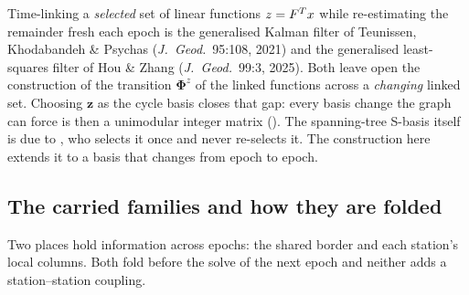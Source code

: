 \documentclass[main.tex]{subfiles}
\begin{document}
\begin{remark}
Time-linking a \emph{selected} set of linear functions $z =
F^{T}x$ while re-estimating the remainder fresh each epoch is
the generalised Kalman filter of Teunissen, Khodabandeh \& Psychas
(\emph{J.\ Geod.}\ 95:108, 2021) and the generalised least-squares
filter of Hou \& Zhang (\emph{J.\ Geod.}\ 99:3, 2025).  Both leave open
the construction of the transition $\bm{\Phi}^z$ of the linked functions
across a \emph{changing} linked set.  Choosing $\bm{z}$ as the cycle
basis closes that gap: every basis change the graph can force is then a
unimodular integer matrix ().  The
spanning-tree S-basis itself is due to \textcite{deJonge1998processing},
who selects it once and never re-selects it.  The construction here
extends it to a basis that changes from epoch to epoch.
\end{remark}

\subsection{The carried families and how they are folded}
\label{sec:net-carry-families}

Two places hold information across epochs: the shared border and each
station's local columns.  Both fold before the solve of the next epoch
and neither adds a station--station coupling.
\end{document}

